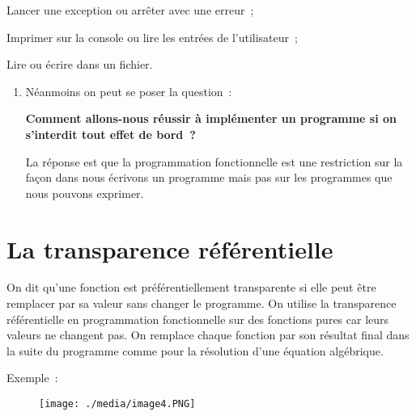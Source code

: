 \documentclass[12pt]{article}
\begin{document}
Lancer une exception ou arrêter avec une erreur ;\par

Imprimer sur la console ou lire les entrées de l’utilisateur ;\par

Lire ou écrire dans un fichier.\par


\vspace{\baselineskip}
\begin{enumerate}
	\item Néanmoins on peut se poser la question :\par

\begin{Center}
\textbf{Comment allons-nous réussir à implémenter un programme si on s’interdit tout effet de bord ?}
\end{Center}\par

La réponse est que la programmation fonctionnelle est une restriction sur la façon dans nous écrivons un programme mais pas sur les programmes que nous pouvons exprimer.\par


\end{enumerate}\section*{La transparence référentielle}
On dit qu’une fonction est préférentiellement transparente si elle peut être remplacer par sa valeur sans changer le programme. On utilise la transparence référentielle en programmation fonctionnelle sur des fonctions pures car leurs valeurs ne changent pas. On remplace chaque fonction par son résultat final dans la suite du programme comme pour la résolution d’une équation algébrique.\par

Exemple :\par




\begin{figure}[H]
	\begin{Center}
		\texttt{[image: ./media/image4.PNG]}
	\end{Center}
\end{figure}
\end{document}
